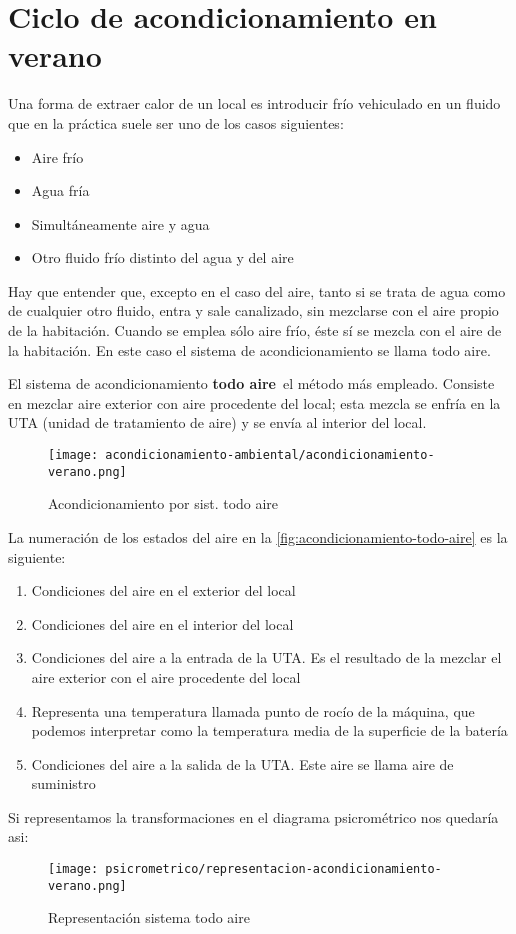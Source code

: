         \section{Ciclo de acondicionamiento en verano}

        Una forma de extraer calor de un local es introducir fr\'io vehiculado en un fluido que en la pr\'actica suele ser uno de los casos siguientes:
        \begin{itemize}
            \item Aire fr\'io
            \item Agua fr\'ia
            \item Simult\'aneamente aire y agua
            \item Otro fluido fr\'io distinto del agua y del aire 
        \end{itemize}
        Hay que entender que, excepto en el caso del aire, tanto si se trata de agua como de cualquier otro fluido, entra y sale canalizado, sin mezclarse con el aire propio de la habitaci\'on. Cuando se emplea s\'olo aire fr\'io, \'este s\'i se mezcla con el aire de la habitaci\'on. En este caso el sistema de acondicionamiento se llama todo aire.

        El sistema de acondicionamiento \textbf{todo aire}\ el m\'etodo m\'as empleado. Consiste en mezclar aire exterior con aire procedente del local; esta mezcla se enfr\'ia en la UTA (unidad de tratamiento de aire) y se env\'ia al interior del local.
        \begin{figure}[H]
            \centering
            \texttt{[image: acondicionamiento-ambiental/acondicionamiento-verano.png]}
            \caption{Acondicionamiento por sist. todo aire}
            \label{fig:acondicionamiento-todo-aire}
        \end{figure}
        La numeraci\'on de los estados del aire en la \autoref{fig:acondicionamiento-todo-aire} es la siguiente:
        \begin{enumerate}
            \item Condiciones del aire en el exterior del local
            \item Condiciones del aire en el interior del local
            \item Condiciones del aire a la entrada de la UTA. Es el resultado de la mezclar el aire exterior con el aire procedente del local
            \item Representa una temperatura llamada punto de roc\'io de la m\'aquina, que podemos interpretar como la temperatura media de la superficie de la bater\'ia
            \item Condiciones del aire a la salida de la UTA. Este aire se llama aire de suministro
        \end{enumerate}
        Si representamos la transformaciones en el diagrama psicrom\'etrico nos quedar\'ia asi:
         \begin{figure}[H]
             \centering
             \texttt{[image: psicrometrico/representacion-acondicionamiento-verano.png]}
             \caption{Representaci\'on sistema todo aire}
             \label{fig:representacion-todo-aire}
         \end{figure}
        
 